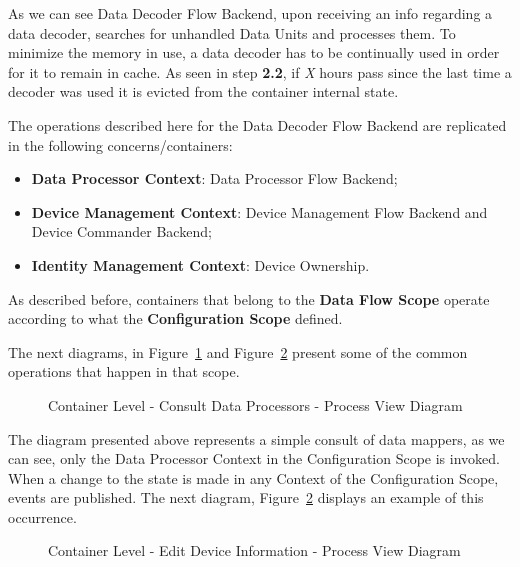 As we can see Data Decoder Flow Backend, upon receiving an info regarding a data decoder, searches for unhandled Data Units and processes them.
To minimize the memory in use, a data decoder has to be continually used in order for it to remain in cache. As seen in step \textbf{2.2}, if \textit{X} hours pass since the last time a decoder was used it is evicted from the container internal state.

The operations described here for the Data Decoder Flow Backend are replicated in the following concerns/containers:

\begin{itemize}
   \item \textbf{Data Processor Context}: Data Processor Flow Backend;
   \item \textbf{Device Management Context}: Device Management Flow Backend and Device Commander Backend;
   \item \textbf{Identity Management Context}: Device Ownership.
\end{itemize}

As described before, containers that belong to the \textbf{Data Flow Scope} operate according to what the \textbf{Configuration Scope} defined.

The next diagrams, in Figure~\ref{fig:design:architecture:platform:container:process:diagram:processor} and Figure~\ref{fig:design:architecture:platform:container:process:diagram:device} present some of the common operations that happen in that scope.

\begin{figure}[H]
   \centering
   \resizebox{0.8\columnwidth}{!}
   {
      
   }
   \caption[Container Level - Consult Data Processors - Process View Diagram]{Container Level - Consult Data Processors - Process View Diagram}
   \label{fig:design:architecture:platform:container:process:diagram:processor}
\end{figure}

The diagram presented above represents a simple consult of data mappers, as we can see, only the Data Processor Context in the Configuration Scope is invoked. When a change to the state is made in any Context of the Configuration Scope, events are published. The next diagram, Figure~\ref{fig:design:architecture:platform:container:process:diagram:device} displays an example of this occurrence.

\begin{figure}[H]
   \centering
   \resizebox{0.8\columnwidth}{!}
   {
      
   }
   \caption[Container Level - Edit Device Information - Process View Diagram]{Container Level - Edit Device Information - Process View Diagram}
   \label{fig:design:architecture:platform:container:process:diagram:device}
\end{figure}

